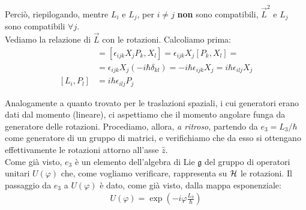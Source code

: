 \documentclass[../../FisicaTeorica.tex]{subfiles}
\begin{document}
Perciò, riepilogando, mentre $L_i$ e $L_j$, per $i\neq j$ \textbf{non} sono compatibili, $\vec{L}^2$ e $L_j$ sono compatibili $\forall j$.\\

Vediamo la relazione di $\vec{L}$ con le rotazioni. Calcoliamo prima:
\begin{align*}
[L_i, X_l]&=[\epsilon_{ijk} X_j P_k, X_l] = \epsilon_{ijk} X_j[P_k, X_l] =\\
&= \epsilon_{ijk} X_j (-i\hbar \delta_{kl}) = - i\hbar \epsilon_{ijk}X_j = i\hbar \epsilon_{ilj}X_j\\
[L_i, P_l] &= i\hbar \epsilon_{ilj} P_j
\end{align*}

Analogamente a quanto trovato per le traslazioni spaziali, i cui generatori erano dati dal momento (lineare), ci aspettiamo che il momento angolare funga da generatore delle rotazioni. Procediamo, allora, \textit{a ritroso}, partendo da $e_3 = L_3/\hbar$ come generatore di un gruppo di matrici, e verifichiamo che da esso si ottengano effettivamente le rotazioni attorno all'asse $\hat{z}$.\\
Come già visto, $e_3$ è un elemento dell'algebra di Lie $\mathfrak{g}$ del gruppo di operatori unitari $U(\varphi)$ che, come vogliamo verificare, rappresenta su $\mathcal{H}$ le rotazioni. Il passaggio da $e_3$ a $U(\varphi)$ è dato, come già visto, dalla mappa esponenziale:
\begin{align*}
U(\varphi) = \exp\left(-i\varphi\frac{L_3}{\hbar}\right)
\end{align*}
\end{document}
